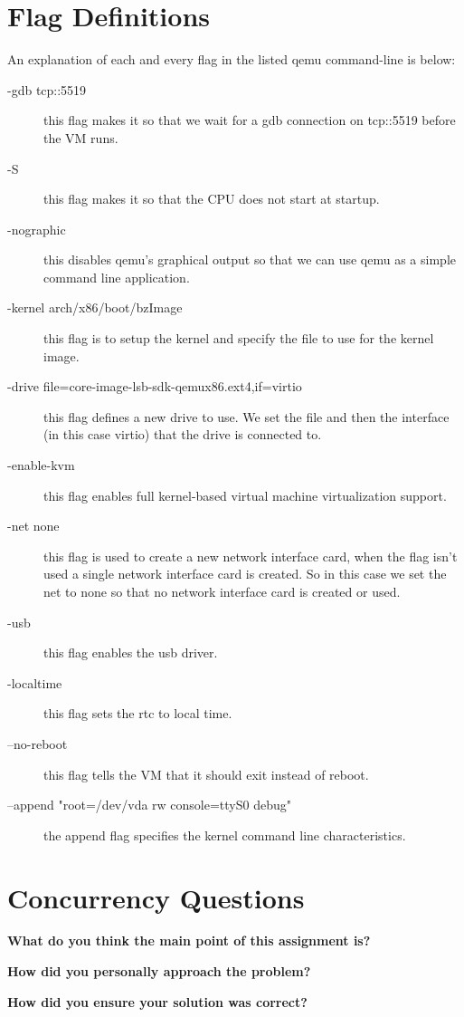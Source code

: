 \documentclass[10pt,letterpaper,draftclsnofoot,onecolumn]{IEEEtran}
\begin{document}
\section{Flag Definitions}
\noindent An explanation of each and every flag in the listed qemu command-line is below:
\begin{description}
\item [-gdb tcp::5519] this flag makes it so that we wait for a gdb connection on tcp::5519 before the VM runs.
\item [-S] this flag makes it so that the CPU does not start at startup.
\item [-nographic] this disables qemu's graphical output so that we can use qemu as a simple command line application.
\item [-kernel arch/x86/boot/bzImage] this flag is to setup the kernel and specify the file to use for the kernel image.
\item [-drive file=core-image-lsb-sdk-qemux86.ext4,if=virtio] this flag defines a new drive to use. We set the file and then the interface (in this case virtio) that the drive is connected to.
\item [-enable-kvm] this flag enables full kernel-based virtual machine virtualization support.
\item [-net none] this flag is used to create a new network interface card, when the flag isn’t used a single network interface card is created. So in this case we set the net to none so that no network interface card is created or used.
\item [-usb] this flag enables the usb driver.
\item [-localtime] this flag sets the rtc to local time.
\item [--no-reboot] this flag tells the VM that it should exit instead of reboot.
\item [--append "root=/dev/vda rw console=ttyS0 debug"] the append flag specifies the kernel command line characteristics.
\end{description}

\section{Concurrency Questions}
\noindent\textbf{What do you think the main point of this assignment is?}

\noindent\textbf{How did you personally approach the problem?}

\noindent\textbf{How did you ensure your solution was correct?}
\end{document}
